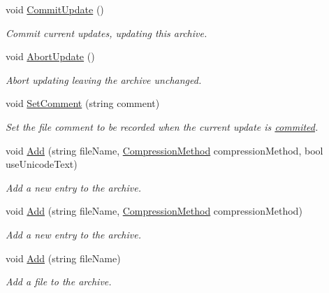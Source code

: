\begin{DoxyCompactItemize}
void \hyperlink{class_i_c_sharp_code_1_1_sharp_zip_lib_1_1_zip_1_1_zip_file_a047075c793bc97073b0531d6d0317bd9}{Commit\+Update} ()
\begin{DoxyCompactList}\small\item\em Commit current updates, updating this archive. \end{DoxyCompactList}\item 
void \hyperlink{class_i_c_sharp_code_1_1_sharp_zip_lib_1_1_zip_1_1_zip_file_a2c0a4ecff350786d09c0e4ad0e15fdc8}{Abort\+Update} ()
\begin{DoxyCompactList}\small\item\em Abort updating leaving the archive unchanged. \end{DoxyCompactList}\item 
void \hyperlink{class_i_c_sharp_code_1_1_sharp_zip_lib_1_1_zip_1_1_zip_file_a13268d97706639a7d97d38ee014beeb9}{Set\+Comment} (string comment)
\begin{DoxyCompactList}\small\item\em Set the file comment to be recorded when the current update is \hyperlink{class_i_c_sharp_code_1_1_sharp_zip_lib_1_1_zip_1_1_zip_file_a047075c793bc97073b0531d6d0317bd9}{commited}. \end{DoxyCompactList}\item 
void \hyperlink{class_i_c_sharp_code_1_1_sharp_zip_lib_1_1_zip_1_1_zip_file_ab60cc5249d7458c09f8374dd6fc687a9}{Add} (string file\+Name, \hyperlink{namespace_i_c_sharp_code_1_1_sharp_zip_lib_1_1_zip_a90a0e174eca72bf6b490bae40d83a09e}{Compression\+Method} compression\+Method, bool use\+Unicode\+Text)
\begin{DoxyCompactList}\small\item\em Add a new entry to the archive. \end{DoxyCompactList}\item 
void \hyperlink{class_i_c_sharp_code_1_1_sharp_zip_lib_1_1_zip_1_1_zip_file_a409d1844e47870ecdddc50fef5bd9098}{Add} (string file\+Name, \hyperlink{namespace_i_c_sharp_code_1_1_sharp_zip_lib_1_1_zip_a90a0e174eca72bf6b490bae40d83a09e}{Compression\+Method} compression\+Method)
\begin{DoxyCompactList}\small\item\em Add a new entry to the archive. \end{DoxyCompactList}\item 
void \hyperlink{class_i_c_sharp_code_1_1_sharp_zip_lib_1_1_zip_1_1_zip_file_aebba11ba220d3dcebf6261227d7d9740}{Add} (string file\+Name)
\begin{DoxyCompactList}\small\item\em Add a file to the archive. \end{DoxyCompactList}\item 

\end{DoxyCompactItemize}
